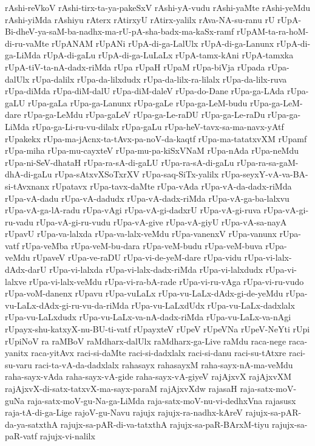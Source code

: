 {rAshi-reVkoV
rAshi-tirx-ta-ya-pakeSxV
rAshi-yA-vudu
rAshi-yaMte
rAshi-yeMdu
rAshi-yiMda
rAshiyu
rAterx
rAtirxyU
rAtirx-yalilx
rAva-NA-su-ranu
rU
rUpA-Bi-dheV-ya-saM-ba-nadhx-ma-rU-pA-sha-badx-ma-kaSx-ramf
rUpAM-ta-ra-hoM-di-ru-vaMte
rUpANAM
rUpANi
rUpA-di-ga-LalUlx
rUpA-di-ga-Lanunx
rUpA-di-ga-LiMda
rUpA-di-gaLu
rUpA-di-ga-LuLaLx
rUpA-tamx-kAni
rUpA-tamxka
rUpA-tiV-ta-nA-dadx-riMda
rUpa
rUpaH
rUpaM
rUpa-biVja
rUpada
rUpa-dalUlx
rUpa-dalilx
rUpa-da-lilxdudx
rUpa-da-lilx-ra-lilalx
rUpa-da-lilx-ruva
rUpa-diMda
rUpa-diM-dalU
rUpa-diM-daleV
rUpa-do-Dane
rUpa-ga-LAda
rUpa-gaLU
rUpa-gaLa
rUpa-ga-Lanunx
rUpa-gaLe
rUpa-ga-LeM-budu
rUpa-ga-LeM-dare
rUpa-ga-LeMdu
rUpa-gaLeV
rUpa-ga-Le-raDU
rUpa-ga-Le-raDu
rUpa-ga-LiMda
rUpa-ga-Li-ru-vu-dilalx
rUpa-gaLu
rUpa-heV-tavx-sa-ma-navx-yAtf
rUpakekx
rUpa-ma-jAcnx-ta-tAvx-pa-noV-da-kaqtf
rUpa-ma-tatatxvXM
rUpamf
rUpa-miha
rUpa-mu-cayxteV
rUpa-mu-pa-kiSxVNaM
rUpa-nAda
rUpa-neMdu
rUpa-ni-SeV-dhataH
rUpa-ra-sA-di-gaLU
rUpa-ra-sA-di-gaLu
rUpa-ra-sa-gaM-dhA-di-gaLu
rUpa-sAtxvXSoTxrXV
rUpa-saq-SiTx-yalilx
rUpa-seyxY-vA-va-BA-si-tAvxnanx
rUpatavx
rUpa-tavx-daMte
rUpa-vAda
rUpa-vA-da-dadx-riMda
rUpa-vA-dadu
rUpa-vA-dadudx
rUpa-vA-dadx-riMda
rUpa-vA-ga-ba-lalxvu
rUpa-vA-ga-lA-radu
rUpa-vAgi
rUpa-vA-gi-dadxrU
rUpa-vA-gi-ruva
rUpa-vA-gi-ru-vadu
rUpa-vA-gi-ru-vudu
rUpa-vA-give
rUpa-vA-giyU
rUpa-vA-sa-nayA
rUpavU
rUpa-va-lalxda
rUpa-va-lalx-veMdu
rUpa-vanenxV
rUpa-vanunx
rUpa-vatf
rUpa-veMba
rUpa-veM-bu-dara
rUpa-veM-budu
rUpa-veM-buva
rUpa-veMdu
rUpaveV
rUpa-ve-raDU
rUpa-vi-de-yeM-dare
rUpa-vidu
rUpa-vi-lalx-dAdx-darU
rUpa-vi-lalxda
rUpa-vi-lalx-dadx-riMda
rUpa-vi-lalxdudx
rUpa-vi-lalxve
rUpa-vi-lalx-veMdu
rUpa-vi-ra-bA-rade
rUpa-vi-ru-vAga
rUpa-vi-ru-vudo
rUpa-voM-danenx
rUpavu
rUpa-vuLaLx
rUpa-vu-LaLx-dAdx-gi-de-yeMdu
rUpa-vu-LaLx-dAdx-gi-ru-vu-da-riMda
rUpa-vu-LaLxdUdx
rUpa-vu-LaLx-dadxlalx
rUpa-vu-LaLxdudx
rUpa-vu-LaLx-va-nA-dadx-riMda
rUpa-vu-LaLx-va-nAgi
rUpayx-shu-katxyX-nu-BU-ti-vatf
rUpayxteV
rUpeV
rUpeVNa
rUpeV-NeYti
rUpi
rUpiNoV
ra
raMBoV
raMdharx-dalUlx
raMdharx-ga-Live
raMdu
raca-nege
raca-yanitx
raca-yitAvx
raci-si-daMte
raci-si-dadxlalx
raci-si-danu
raci-su-tAtxre
raci-su-varu
raci-ta-vA-da-dadxlalx
rahasayx
rahasayxM
raha-sayx-nA-ma-veMdu
raha-sayx-vAda
raha-sayx-vA-gide
raha-sayx-vA-giyeV
rajAjxvX
rajAjxvXM
rajAjxvX-di-satx-tatxvX-ma-sayx-paraM
rajAjxvXdw
rajasaH
raja-satx-moV-guNa
raja-satx-moV-gu-Na-ga-LiMda
raja-satx-moV-nu-vi-dedhxVna
rajasusx
raja-tA-di-ga-Lige
rajoV-gu-Navu
rajujx
rajujx-ra-nadhx-kAreV
rajujx-sa-pAR-da-ya-satxthA
rajujx-sa-pAR-di-va-tatxthA
rajujx-sa-paR-BArxM-tiyu
rajujx-sa-paR-vatf
rajujx-vi-nalilx
}
